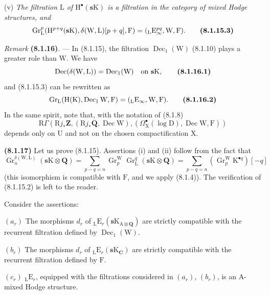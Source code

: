 \documentclass[11pt,leqno]{article}
\begin{document}
(v) \textit{The filtration \(\mathrm{L}\) of \(\mathrm{H}^{\bullet}(\mathbf{s}\mathrm{K})\) is a filtration in the category of mixed Hodge structures, and}
\[
\operatorname{Gr}_{\mathrm{L}}^{p}
(\mathrm{H}^{p+q}(\mathbf{s}\mathrm{K}),
\delta(\mathrm{W},\mathrm{L})[p+q],\mathrm{F})
=
({}_{\mathrm{L}}\mathrm{E}_{\infty}^{pq},\mathrm{W},\mathrm{F}).
\tag*{\textbf{(8.1.15.3)}}
\]

\textit{Remark} \textbf{(8.1.16)}. — In (8.1.15), the filtration \(\operatorname{Dec}_{1}(\mathrm{W})\) (8.1.10) plays a greater role than \(\mathrm{W}\). We have
\[
\operatorname{Dec}(\delta(\mathrm{W},\mathrm{L}))
=
\operatorname{Dec}_{1}(\mathrm{W})
\quad\text{on }\mathbf{s}\mathrm{K},
\tag*{\textbf{(8.1.16.1)}}
\]
and (8.1.15.3) can be rewritten as
\[
\operatorname{Gr}_{\mathrm{L}}
(\mathrm{H}(\mathrm{K}),\operatorname{Dec}_{1}\mathrm{W},\mathrm{F})
=
({}_{\mathrm{L}}\mathrm{E}_{\infty},\mathrm{W},\mathrm{F}).
\tag*{\textbf{(8.1.16.2)}}
\]
In the same spirit, note that, with the notation of (8.1.8)
\[
\mathrm{R}\Gamma
(\mathrm{R}j_{\ast}\mathbf{Z},
(\mathrm{R}j_{\ast}\mathbf{Q},\operatorname{Dec}\mathrm{W}),
(\Omega_{\mathrm{X}}^\bullet(\log\mathrm{D}),
\operatorname{Dec}\mathrm{W},\mathrm{F}))
\]
depends only on \(\mathrm{U}\) and not on the chosen compactification \(\mathrm{X}\).

\textbf{(8.1.17)} Let us prove (8.1.15). Assertions (i) and (ii) follow from the fact that
\[
\operatorname{Gr}_{n}^{\delta(\mathrm{W},\mathrm{L})}
(\mathbf{s}\mathrm{K}\otimes\mathbf{Q})
=
\sum_{p-q=n}
\operatorname{Gr}_{p}^{\mathrm{W}}\operatorname{Gr}_{\mathrm{L}}^{q}
(\mathbf{s}\mathrm{K}\otimes\mathbf{Q})
=
\sum_{p-q=n}
(\operatorname{Gr}_{p}^{\mathrm{W}}\mathrm{K}^{\bullet q})[-q]
\]
(this isomorphism is compatible with \(\mathrm{F}\), and we apply (8.1.4)). The verification of (8.1.15.2) is left to the reader.

Consider the assertions:

\((a_{r})\) The morphisms \(d_{r}\) of \({}_{\mathrm{L}}\mathrm{E}_{r}(\mathbf{s}\mathrm{K}_{\mathrm{A}\otimes\mathbf{Q}})\) are strictly compatible with the recurrent filtration defined by \(\operatorname{Dec}_{1}(\mathrm{W})\).

\((b_{r})\) The morphisms \(d_{r}\) of \({}_{\mathrm{L}}\mathrm{E}_{r}(\mathbf{s}\mathrm{K}_{\mathbf{C}})\) are strictly compatible with the recurrent filtration defined by \(\mathrm{F}\).

\((c_{r})\) \({}_{\mathrm{L}}\mathrm{E}_{r}\), equipped with the filtrations considered in \((a_{r})\), \((b_{r})\), is an \(\mathrm{A}\)-mixed Hodge structure.
\end{document}

